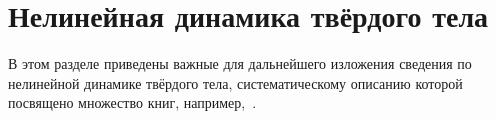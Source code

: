 \documentclass[12pt, a4paper]{report}
\begin{document}


\section{Нелинейная динамика твёрдого тела}
В этом разделе приведены важные для дальнейшего изложения сведения по нелинейной динамике твёрдого тела, систематическому описанию которой посвящено множество книг, например,~\cite{LurieNL}. 
\end{document}
